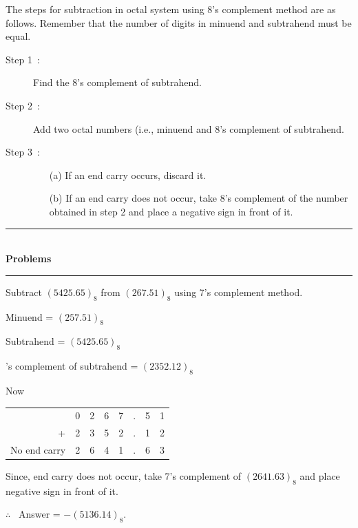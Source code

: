  The steps for subtraction in octal system using 8's complement method are as follows. Remember that the number of digits in minuend and subtrahend must be equal.
\begin{description}
\item[Step 1~:] Find the 8's complement of subtrahend.

\item[Step 2~:] Add two octal numbers (i.e., minuend and 8's complement of subtrahend.

\item[Step 3~:] 
\begin{itemize}
\item[(a)] If an end carry occurs, discard it.

\item[(b)] If an end carry does not occur, take 8's complement of the number obtained in step 2 and place a negative sign in front of it.
\end{itemize}
\end{description}

\begin{center}
\rule{4cm}{1pt}\\
{\bf\Large Problems}\\[-3pt]
\rule{4cm}{1pt}
\end{center}

\begin{problem}\label{prob5.34}
Subtract $(5425.65)_{8}$ from $(267.51)_{8}$ using 7's complement method.
\end{problem}

\begin{solution} Minuend = $(257.51)_{8}$

\qquad\!Subtrahend = $(5425.65)_{8}$

's complement of subtrahend = $(2352.12)_{8}$

Now
\begin{center}
\begin{tabular}{rccccccc}
 & 0 & 2 & 6 & 7 & . & 5 & 1\\
+ & 2 & 3 & 5 & 2 & . & 1 & 2\\
\cline{2-8}
No end carry & 2 & 6 & 4 & 1 & . & 6 & 3
\end{tabular}
\end{center}
Since, end carry does not occur, take 7's complement of $(2641.63)_{8}$ and place negative sign in front of it.

$\therefore$~ Answer = $-(5136.14)_{8}$.
\end{solution}

